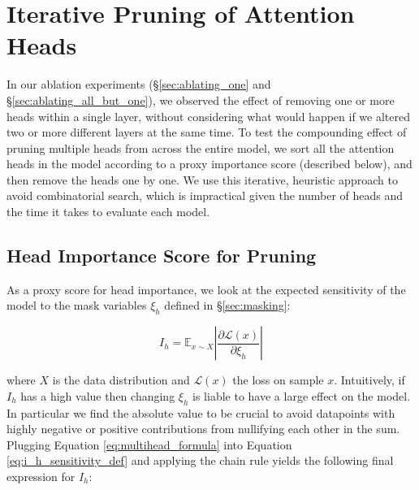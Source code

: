 \section{Iterative Pruning of Attention Heads}
\label{sec:pruning}



In our ablation experiments (\S\ref{sec:ablating_one} and \S\ref{sec:ablating_all_but_one}), we observed the effect of removing one or more heads within a single layer, without considering what would happen if we altered two or more different layers at the same time.
To test the compounding effect of pruning multiple heads from across the entire model, we sort all the attention heads in the model according to a proxy importance score (described below), and then remove the heads one by one. We use this iterative, heuristic approach to avoid combinatorial search, which is impractical given the number of heads and the time it takes to evaluate each model.

\subsection{Head Importance Score for Pruning}

As a proxy score for head importance, we look at the expected sensitivity of the model to the mask variables $\xi_h$ defined in \S\ref{sec:masking}:

\begin{equation}
\label{eq:i_h_sensitivity_def}
    I_h= \mathbb E_{x\sim X}\left| \frac{\partial \mathcal{L}(x)}{\partial \xi_h}\right|
\end{equation}

where $X$ is the data distribution and $\mathcal{L}(x)$ the loss on sample $x$. Intuitively, if $I_h$ has a high value then changing $\xi_h$ is liable to have a large effect on the model. In particular we find the absolute value to be crucial to avoid datapoints with highly negative or positive contributions from nullifying each other in the sum. Plugging Equation \ref{eq:multihead_formula} into Equation \ref{eq:i_h_sensitivity_def} and applying the chain rule yields the following final expression for $I_h$:

